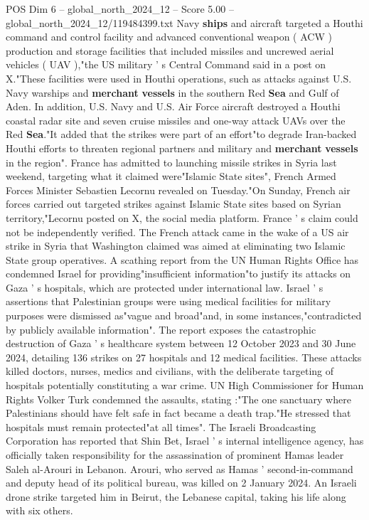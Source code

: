 \begin{textsample}{POS Dim 6 – global\_north\_2024\_12 – Score 5.00 – global\_north\_2024\_12/119484399.txt}
Navy \textbf{ships} and aircraft targeted a Houthi command and control facility and advanced conventional weapon ( ACW ) production and storage facilities that included missiles and uncrewed aerial vehicles ( UAV ),"the US military ' s Central Command said in a post on X."These facilities were used in Houthi operations, such as attacks against U.S.
Navy warships and \textbf{merchant} \textbf{vessels} in the southern Red \textbf{Sea} and Gulf of Aden.
In addition, U.S.
Navy and U.S.
Air Force aircraft destroyed a Houthi coastal radar site and seven cruise missiles and one-way attack UAVs over the Red \textbf{Sea}."It added that the strikes were part of an effort"to degrade Iran-backed Houthi efforts to threaten regional partners and military and \textbf{merchant} \textbf{vessels} in the region".
France has admitted to launching missile strikes in Syria last weekend, targeting what it claimed were"Islamic State sites", French Armed Forces Minister Sebastien Lecornu revealed on Tuesday."On Sunday, French air forces carried out targeted strikes against Islamic State sites based on Syrian territory,"Lecornu posted on X, the social media platform.
France ' s claim could not be independently verified.
The French attack came in the wake of a US air strike in Syria that Washington claimed was aimed at eliminating two Islamic State group operatives.
A scathing report from the UN Human Rights Office has condemned Israel for providing"insufficient information"to justify its attacks on Gaza ' s hospitals, which are protected under international law.
Israel ' s assertions that Palestinian groups were using medical facilities for military purposes were dismissed as"vague and broad"and, in some instances,"contradicted by publicly available information".
The report exposes the catastrophic destruction of Gaza ' s healthcare system between 12 October 2023 and 30 June 2024, detailing 136 strikes on 27 hospitals and 12 medical facilities.
These attacks killed doctors, nurses, medics and civilians, with the deliberate targeting of hospitals potentially constituting a war crime.
UN High Commissioner for Human Rights Volker Turk condemned the assaults, stating :"The one sanctuary where Palestinians should have felt safe in fact became a death trap."He stressed that hospitals must remain protected"at all times".
The Israeli Broadcasting Corporation has reported that Shin Bet, Israel ' s internal intelligence agency, has officially taken responsibility for the assassination of prominent Hamas leader Saleh al-Arouri in Lebanon.
Arouri, who served as Hamas ' second-in-command and deputy head of its political bureau, was killed on 2 January 2024.
An Israeli drone strike targeted him in Beirut, the Lebanese capital, taking his life along with six others.

\end{textsample}
